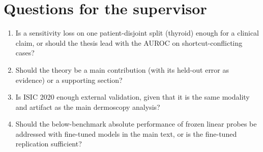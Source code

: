 \section{Questions for the supervisor}
\begin{enumerate}\itemsep1pt
\item Is a sensitivity loss on one patient-disjoint split (thyroid) enough for a clinical claim, or should the thesis
lead with the AUROC on shortcut-conflicting cases?
\item Should the theory be a main contribution (with its held-out error as evidence) or a supporting section?
\item Is ISIC 2020 enough external validation, given that it is the same modality and artifact as the main dermoscopy
analysis?
\item Should the below-benchmark absolute performance of frozen linear probes be addressed with fine-tuned models in the
main text, or is the fine-tuned replication sufficient?
\end{enumerate}




